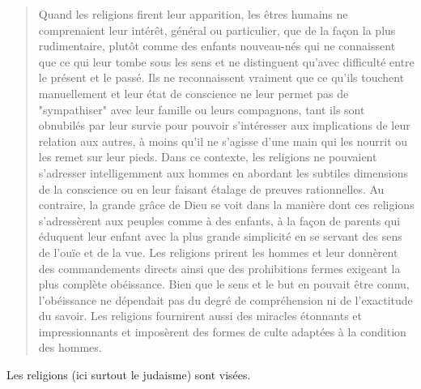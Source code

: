 \begin{quote}
  Quand les religions firent leur apparition, les êtres humains ne
comprenaient leur intérêt, général ou particulier, que de la façon la
plus rudimentaire, plutôt comme des enfants nouveau-nés qui ne
connaissent que ce qui leur tombe sous les sens et ne distinguent
qu'avec difficulté entre le présent et le passé. Ils ne reconnaissent
vraiment que ce qu'ils touchent manuellement et leur état de conscience
ne leur permet pas de "sympathiser" avec leur famille ou leurs
compagnons, tant ils sont obnubilés par leur survie pour pouvoir
s'intéresser aux implications de leur relation aux autres, à moins qu'il
ne s'agisse d'une main qui les nourrit ou les remet sur leur pieds. Dans
ce contexte, les religions ne pouvaient s'adresser intelligemment aux
hommes en abordant les subtiles dimensions de la conscience ou en leur
faisant étalage de preuves rationnelles. Au contraire, la grande grâce
de Dieu se voit dans la manière dont ces religions s'adressèrent aux
peuples comme à des enfants, à la façon de parents qui éduquent leur
enfant avec la plus grande simplicité en se servant des sens de l'ouïe
et de la vue. Les religions prirent les hommes et leur donnèrent des
commandements directs ainsi que des prohibitions fermes exigeant la plus
complète obéissance. Bien que le sens et le but en pouvait être connu,
l'obéissance ne dépendait pas du degré de compréhension ni de
l'exactitude du savoir. Les religions fournirent aussi des miracles
étonnants et impressionnants et imposèrent des formes de culte adaptées
à la condition des hommes.
    
\end{quote}
Les religions (ici surtout le judaisme) sont visées.

